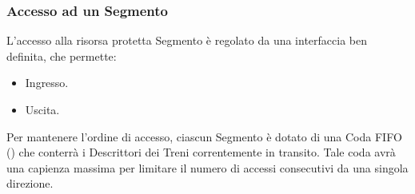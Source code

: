 	
		\subsubsection{Accesso ad un Segmento}
		
		L'accesso alla risorsa protetta Segmento è regolato da una interfaccia ben definita, che permette:
			\begin{itemize}
				\item Ingresso.
				\item Uscita.
			\end{itemize}
		Per mantenere l'ordine di accesso, ciascun Segmento è dotato di una Coda FIFO () che conterrà i Descrittori dei Treni correntemente in transito. Tale coda avrà una capienza massima per limitare il numero di accessi consecutivi da una singola direzione. 
		
